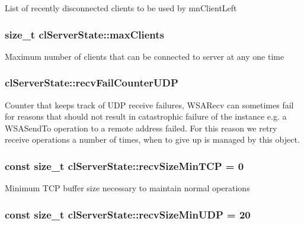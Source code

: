 \label{classcl_server_state_a1928a46878962bc4d2c804bf21074319}
List of recently disconnected clients to be used by {\ttfamily mnClientLeft} \hypertarget{classcl_server_state_a78bea97e597f0122863a4ee259a24785}{
\subsubsection[{maxClients}]{\setlength{\rightskip}{0pt plus 5cm}size\_\-t {\bf clServerState::maxClients}}}
\label{classcl_server_state_a78bea97e597f0122863a4ee259a24785}
Maximum number of clients that can be connected to server at any one time \hypertarget{classcl_server_state_a375603ab73421b96cfe100570d86300d}{
\subsubsection[{recvFailCounterUDP}]{ {\bf clServerState::recvFailCounterUDP}}}
\label{classcl_server_state_a375603ab73421b96cfe100570d86300d}
Counter that keeps track of UDP receive failures, WSARecv can sometimes fail for reasons that should not result in catastrophic failure of the instance e.g. a WSASendTo operation to a remote address failed. For this reason we retry receive operations a number of times, when to give up is managed by this object. \hypertarget{classcl_server_state_a6f718c1f7be5673a45d04df644f7ce5b}{
\subsubsection[{recvSizeMinTCP}]{\setlength{\rightskip}{0pt plus 5cm}const size\_\-t {\bf clServerState::recvSizeMinTCP} = 0}}
\label{classcl_server_state_a6f718c1f7be5673a45d04df644f7ce5b}
Minimum TCP buffer size necessary to maintain normal operations \hypertarget{classcl_server_state_ae6d8460b8b124c1ece70b94440cea634}{
\subsubsection[{recvSizeMinUDP}]{\setlength{\rightskip}{0pt plus 5cm}const size\_\-t {\bf clServerState::recvSizeMinUDP} = 20}}
